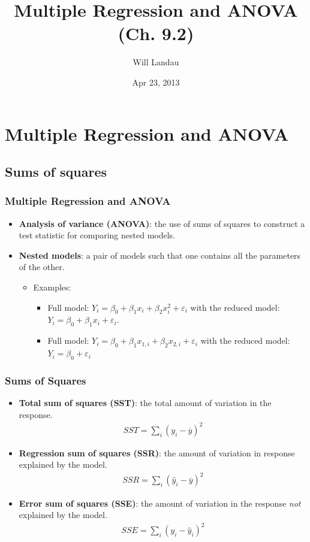 \documentclass[handout]{beamer}\usepackage[]{graphicx}\usepackage[]{color}
\title{Multiple Regression and ANOVA (Ch. 9.2)}
\author{Will Landau}
\date{Apr 23, 2013}
\institute{Iowa State University}
\providecommand{\e}{\varepsilon}
\providecommand{\ov}[1]{\overline{#1}}
\providecommand{\wh}[1]{\widehat{#1}}
\numberwithin{equation}{section}
\begin{document}
\begin{frame}
\titlepage
 \end{frame}
 

\section{Multiple Regression and ANOVA}

\subsection{Sums of squares}

\begin{frame}
\frametitle{Multiple Regression and ANOVA}
\begin{itemize}
\item {\bf Analysis of variance (ANOVA)}: the use of sums of squares to construct a test statistic for comparing nested models.
\pause \item {\bf Nested models}: a pair of models such that one contains all the parameters of the other.
\begin{itemize}
\pause \item Examples:
\begin{itemize}
\pause \item Full model: $Y_i = \beta_0 + \beta_1 x_i + \beta_2 x_i^2 + \e_i$ with the reduced model: $Y_i = \beta_0 + \beta_1 x_i + \e_i$.
\pause \item Full model: $Y_i = \beta_0 + \beta_1 x_{1, i} + \beta_2 x_{2, i} + \e_i$ with the reduced model: $Y_i = \beta_0 + \e_i$
\end{itemize}
\end{itemize}
\end{itemize}
\end{frame}


\begin{frame}
\frametitle{Sums of Squares}
\begin{itemize}
\item {\bf Total sum of squares (SST)}: the total amount of variation in the response.
\begin{align*}
SST = \sum_i (y_i - \ov{y})^2
\end{align*}
\pause \item {\bf Regression sum of squares (SSR)}: the amount of variation in response explained by the model.
\begin{align*}
SSR = \sum_i (\wh{y}_i - \ov{y})^2
\end{align*}
\pause \item {\bf Error sum of squares (SSE)}: the amount of variation in the response \emph{not} explained by the model.
\begin{align*}
SSE = \sum_i (y_i - \wh{y}_i)^2
\end{align*}
\end{itemize}
\end{frame}
\end{document}
